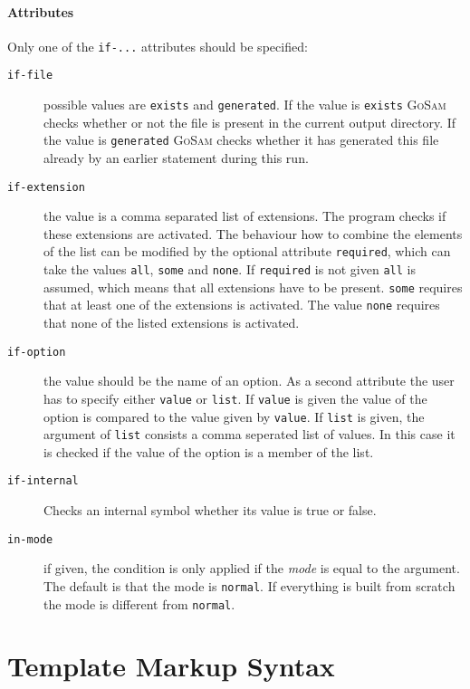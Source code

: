 \documentclass[11pt,a4paper]{refrep}
\newcommand{\golem}{\textsc{GoSam}\xspace}
\begin{document}
\paragraph{Attributes}
Only one of the \texttt{if-...} attributes should be specified:
\begin{description}
\item[\texttt{if-file}] possible values are \texttt{exists} and
\texttt{generated}. If the value is \texttt{exists} \golem{} checks
whether or not the file is present in the current output directory.
If the value is \texttt{generated} \golem{} checks whether it has
generated this file already by an earlier statement during this run.
\item[\texttt{if-extension}] the value is a comma separated list of
extensions. The program checks if these extensions are activated.
The behaviour how to combine the elements of the list
can be modified by the optional attribute
\texttt{required}, which can take the values \texttt{all}, \texttt{some}
and \texttt{none}. If \texttt{required} is not given \texttt{all} is assumed,
which means that all extensions have to be present. \texttt{some} requires
that at least one of the extensions is activated. The value \texttt{none}
requires that none of the listed extensions is activated.
\item[\texttt{if-option}] the value should be the name of an option.
As a second attribute the user has to specify either \texttt{value}
or \texttt{list}. If \texttt{value} is given the value of the option
is compared to the value given by \texttt{value}. If \texttt{list} is
given, the argument of \texttt{list} consists a comma seperated list
of values. In this case it is checked if the value of the option is
a member of the list.
\item[\texttt{if-internal}] Checks an internal symbol whether its value
is true or false.
\item[\texttt{in-mode}] if given, the condition is only applied if the
\emph{mode} is equal to the argument. The default is that the mode is
\texttt{normal}. If everything is built from scratch  the mode is
different from \texttt{normal}.

\end{description}

\section{Template Markup Syntax}
\lstset{language=[fortran]gosamt}
\end{document}
